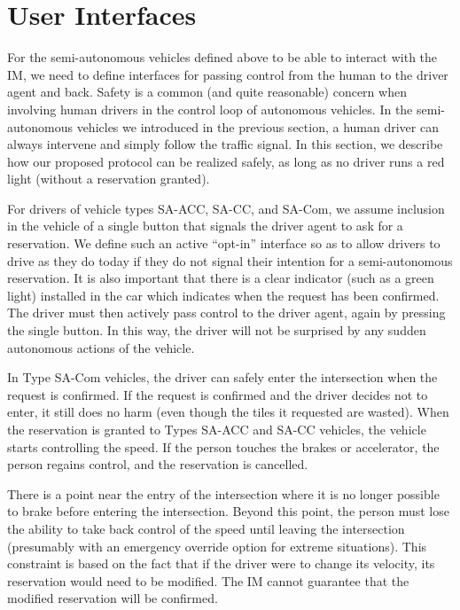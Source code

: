 \section{User Interfaces}
\label{sec:interface}

For the semi-autonomous vehicles defined above to be able to interact
with the IM, we need to define interfaces for passing control from the
human to the driver agent and back.  Safety is a common (and quite
reasonable) concern when involving human drivers in the control loop
of autonomous vehicles.  In the semi-autonomous vehicles we introduced
in the previous section, a human driver can always intervene and
simply follow the traffic signal. In this section, we describe how our
proposed protocol can be realized safely, as long as no driver runs a
red light (without a reservation granted).

For drivers of vehicle types SA-ACC, SA-CC, and SA-Com, we assume
inclusion in the vehicle of a single button that signals the driver
agent to ask for a reservation.  We define such an active ``opt-in''
interface so as to allow drivers to drive as they do today if they do
not signal their intention for a semi-autonomous reservation.  It is
also important that there is a clear indicator (such as a green light)
installed in the car which indicates when the request has been
confirmed.  The driver must then actively pass control to the driver
agent, again by pressing the single button.  In this way, the driver
will not be surprised by any sudden autonomous actions of the vehicle.

In Type SA-Com vehicles, the driver can safely enter the intersection
when the request is confirmed. If the request is confirmed and the
driver decides not to enter, it still does no harm (even though the
tiles it requested are wasted).  When the reservation is granted to
Types SA-ACC and SA-CC vehicles, the vehicle starts controlling the
speed.  If the person touches the brakes or accelerator, the person
regains control, and the reservation is cancelled.

There is a point near the entry of the intersection where it is no
longer possible to brake before entering the intersection. Beyond this
point, the person must lose the ability to take back control of the
speed until leaving the intersection (presumably with an emergency
override option for extreme situations).  This constraint is based on
the fact that if the driver were to change its velocity, its
reservation would need to be modified.  The IM cannot guarantee that
the modified reservation will be confirmed.

